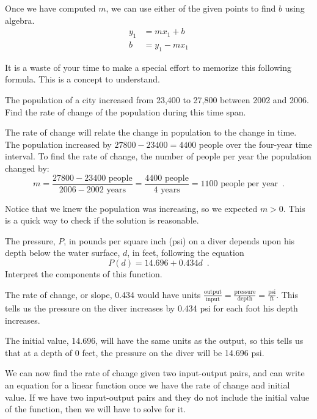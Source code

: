 Once we have computed $m$, we can use either of the given points to find $b$ using algebra.
\begin{align*}
y_1 &= mx_1 + b \\
b &= y_1 - mx_1
\end{align*}
\begin{remark} It is a waste of your time to make a special effort to memorize this following formula. This is a concept to understand.
\end{remark}
\begin{example}
The population of a city increased from 23,400 to 27,800 between 2002 and 2006. Find the rate of change of the population during this time span.

\begin{solution} The rate of change will relate the change in population to the change in time. The population increased by $27800-23400 = 4400$ people over the four-year time interval. To find the rate of change, the number of people per year the population changed by:
$$m = \frac{27800-23400 \mbox{ people}}{2006 - 2002 \mbox{ years}} = \frac{4400\mbox{ people}}{4\mbox{ years}} = 1100 \mbox{ people per year} \enspace .$$
\end{solution}\end{example}
Notice that we knew the population was increasing, so we expected $m>0$. This is a quick way to check if the solution is reasonable.

\begin{example}
The pressure, $P$, in pounds per square inch (psi) on a diver depends upon his depth below the water surface, $d$, in feet, following the equation
$$P(d)=14.696+0.434d \enspace .$$
Interpret the components of this function.

\begin{solution} The rate of change, or slope, 0.434 would have units $\frac{\mbox{output}}{\mbox{input}} = \frac{\mbox{pressure}}{\mbox{depth}}=\frac{\mbox{psi}}{\mbox{ft}}$. This tells us the pressure on the diver increases by 0.434 psi for each foot his depth increases.

The initial value, 14.696, will have the same units as the output, so this tells us that at a depth of 0 feet, the pressure on the diver will be 14.696 psi.
\end{solution}\end{example}

We can now find the rate of change given two input-output pairs, and can write an equation for a linear function once we have the rate of change and initial value. If we have two input-output pairs and they do not include the initial value of the function, then we will have to solve for it.

